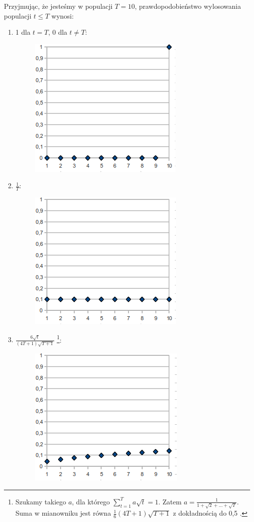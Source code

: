 \documentclass[12pt, a4paper]{article}
\begin{document}
Przyjmując, że jesteśmy w populacji $T = 10$, prawdopodobieństwo wylosowania populacji $t \leq T$ wynosi:
\begin{enumerate}
 \item 1 dla $t=T$, 0 dla $t \neq T$:
  \begin{figure}[H]
  \centering
  \includegraphics[scale=0.5]{img/1.png} 
  \end{figure}
 \item $\frac{1}{T}$:
  \begin{figure}[H]
  \centering
  \includegraphics[scale=0.5]{img/2.png} 
  \end{figure}
 \item $\frac{6\sqrt{t}}{(4T+1)\sqrt{T+1}}$
\footnote{Szukamy takiego $a$, dla którego $\sum\limits_{t=1}^T a\sqrt{t} = 1$. Zatem $a = \frac{1}{1 + \sqrt{2} + \dots + \sqrt{T}}$. 
Suma w mianowniku jest równa $\frac{1}{6}(4T+1)\sqrt{T+1}$ z dokładnością do 0,5 \cite{snehal}.}:
  \begin{figure}[H]
  \centering
  \includegraphics[scale=0.5]{img/3.png} 

\end{figure}
\end{enumerate}
\end{document}
